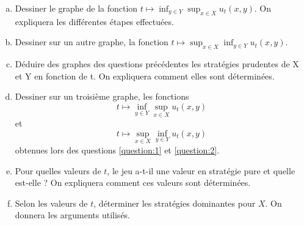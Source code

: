\documentclass[french,11pt,leqno]{article}
\begin{document}
\begin{enumerate}[a)]%
\item Dessiner le graphe de la fonction $t \mapsto \inf_{y \in Y} \sup_{x \in X} u_t(x,y)$. On expliquera les diff\'erentes \'etapes effectu\'ees. \label{question:1}
\item Dessiner sur un autre graphe, la fonction $t \mapsto \sup_{x \in X} \inf_{y \in Y} u_t(x,y)$. \label{question:2}
\item D\'eduire des graphes des questions pr\'ec\'edentes les strat\'egies prudentes de X et Y en fonction de t. 
     On expliquera comment elles sont d\'etermin\'ees.
\item Dessiner sur un troisi\`eme graphe, les fonctions \[t \mapsto \inf_{y \in Y} \sup_{x \in X} u_t(x,y)\] et \[t \mapsto \sup_{x \in X} \inf_{y \in Y} u_t(x,y)\]
 obtenues lors des questions \ref{question:1} et \ref{question:2}. 
\item Pour quelles valeurs de $t$, le jeu a-t-il une valeur en strat\'egie pure et quelle est-elle ? On expliquera comment ces valeurs sont d\'etermin\'ees.
\item Selon les valeurs de $t$, d\'eterminer les strat\'egies dominantes pour $X$. On donnera les arguments utilis\'es.


\end{enumerate}
\end{document}
